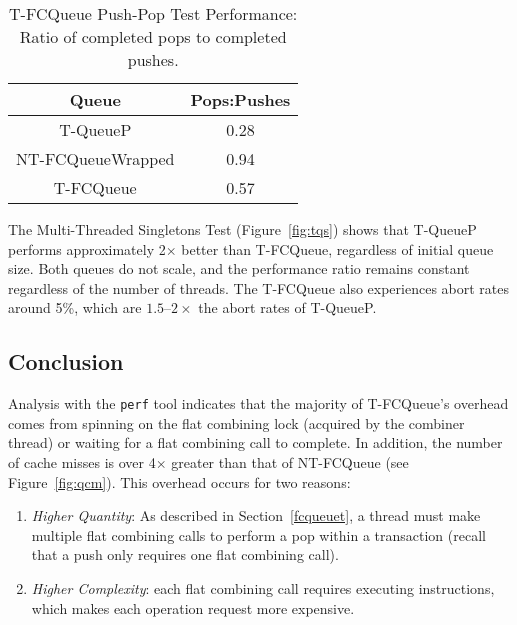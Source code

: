 \begin{table}[t]
        \centering
    \begin{tabular}{|cc|}
        \hline
        Queue & Pops:Pushes\\
        \hline
            T-QueueP & 0.28\\
            NT-FCQueueWrapped & 0.94\\
            T-FCQueue & 0.57\\
        \hline
    \end{tabular}

    \caption{T-FCQueue Push-Pop Test Performance: Ratio of completed pops to completed pushes.}
    \label{tab:tfc_pop_push_ratio}
\end{table}

The Multi-Threaded Singletons Test (Figure~\ref{fig:tqs}) shows that T-QueueP performs approximately 2$\times$ better than T-FCQueue, regardless of initial queue size. Both queues do not scale, and the performance ratio remains constant regardless of the number of threads. The T-FCQueue also experiences abort rates around 5\%, which are $1.5$--$2\times$ the abort rates of T-QueueP.

\vspace{12pt}
\noindent{}

\subsection{Conclusion}
Analysis with the \texttt{perf} tool indicates that the majority of T-FCQueue's overhead comes from spinning on the flat combining lock (acquired by the combiner thread) or waiting for a flat combining call to complete. In addition, the number of cache misses is over 4$\times$ greater than that of NT-FCQueue (see Figure~\ref{fig:qcm}). This overhead occurs for two reasons:
\begin{enumerate}
    \item \emph{Higher Quantity}: As described in Section~\ref{fcqueuet}, a thread must make multiple flat combining calls to perform a pop within a transaction (recall that a push only requires one flat combining call).
\item \emph{Higher Complexity}: each flat combining call requires executing instructions, which makes each operation request more expensive.
\end{enumerate}

